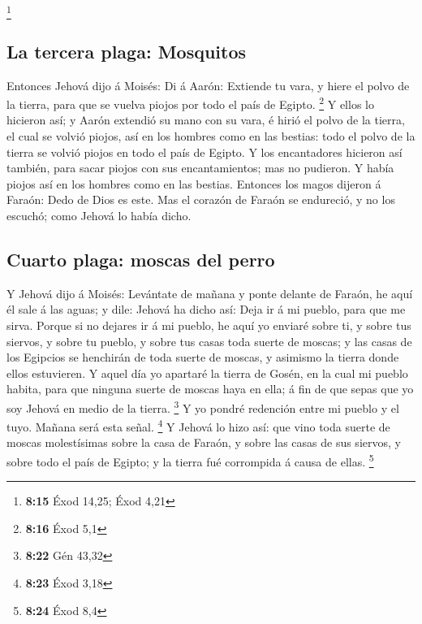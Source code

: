 \footnote{\textbf{8:15} Éxod 14,25; Éxod 4,21}

\hypertarget{la-tercera-plaga-mosquitos}{%
\subsection{La tercera plaga:
Mosquitos}\label{la-tercera-plaga-mosquitos}}

 Entonces Jehová dijo á Moisés: Di á Aarón: Extiende tu
vara, y hiere el polvo de la tierra, para que se vuelva piojos por todo
el país de Egipto. \footnote{\textbf{8:16} Éxod 5,1}  Y
ellos lo hicieron así; y Aarón extendió su mano con su vara, é hirió el
polvo de la tierra, el cual se volvió piojos, así en los hombres como en
las bestias: todo el polvo de la tierra se volvió piojos en todo el país
de Egipto.  Y los encantadores hicieron así también, para
sacar piojos con sus encantamientos; mas no pudieron. Y había piojos así
en los hombres como en las bestias.  Entonces los magos
dijeron á Faraón: Dedo de Dios es este. Mas el corazón de Faraón se
endureció, y no los escuchó; como Jehová lo había dicho.

\hypertarget{cuarto-plaga-moscas-del-perro}{%
\subsection{Cuarto plaga: moscas del
perro}\label{cuarto-plaga-moscas-del-perro}}

 Y Jehová dijo á Moisés: Levántate de mañana y ponte
delante de Faraón, he aquí él sale á las aguas; y dile: Jehová ha dicho
así: Deja ir á mi pueblo, para que me sirva.  Porque si no
dejares ir á mi pueblo, he aquí yo enviaré sobre ti, y sobre tus
siervos, y sobre tu pueblo, y sobre tus casas toda suerte de moscas; y
las casas de los Egipcios se henchirán de toda suerte de moscas, y
asimismo la tierra donde ellos estuvieren.  Y aquel día yo
apartaré la tierra de Gosén, en la cual mi pueblo habita, para que
ninguna suerte de moscas haya en ella; á fin de que sepas que yo soy
Jehová en medio de la tierra. \footnote{\textbf{8:22} Gén 43,32}
 Y yo pondré redención entre mi pueblo y el tuyo. Mañana
será esta señal. \footnote{\textbf{8:23} Éxod 3,18}  Y
Jehová lo hizo así: que vino toda suerte de moscas molestísimas sobre la
casa de Faraón, y sobre las casas de sus siervos, y sobre todo el país
de Egipto; y la tierra fué corrompida á causa de ellas. \footnote{\textbf{8:24}
  Éxod 8,4}

